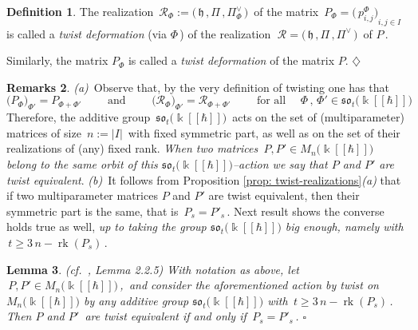 \documentclass[12pt,reqno,twoside,a4paper]{amsart}
\numberwithin{equation}{section}
\newtheorem{lema}{Lemma}[subsection]
\theoremstyle{definition}
\newtheorem{definition}[lema]{Definition}
\newtheorem{rmks}[lema]{Remarks}
\newtheorem{free text}[lema]{}
\theoremstyle{remark}
\newcommand \rk{\operatorname{rk}}
\newcommand{\R}{{\mathcal R}}
\def \kh{{\Bbbk[[\hbar]]}}
\def \lieh{\mathfrak{h}}
\def \lieso{\mathfrak{so}}
\theoremstyle{plain}
\begin{document}
\vskip7pt

\begin{definition}  \label{def: twisted-realization}
%
 The realization  $ \, \R_\Phi := \big(\, \lieh \, , \Pi \, , \Pi^\vee_{\scriptscriptstyle \Phi} \,\big) \, $
 of the matrix  $ \, P_{\scriptscriptstyle \Phi} = {\big(\, p^{\scriptscriptstyle \Phi}_{i,j} \big)}_{i, j \in I} $  \,
 is called a  \textit{twist deformation\/}  (via  $ \Phi \, $)  of the realization
 $ \; \R = \big(\, \lieh \, , \Pi \, , \Pi^\vee \,\big) \, $  of  $ P \, $.
                                                                    \par
   Similarly, the matrix  $ P_{\scriptscriptstyle \Phi} $  is called a  \textit{twist deformation\/}
   of the matrix  $ P $.   \hfill  $ \diamondsuit $
%
\end{definition}

\vskip7pt

\begin{rmks}  \label{rmks: transitivity-twist}
%
 \textit{(a)}\,  Observe that, by the very definition of twisting one has that
  $$  \big(P_{\scriptscriptstyle \Phi}\big)_{\scriptscriptstyle \Phi'} = P_{\scriptscriptstyle \Phi + \Phi'}  \qquad \text{ and }
  \qquad  \big(\R_{\scriptscriptstyle \Phi}\big)_{\scriptscriptstyle \Phi'} = \R_{\scriptscriptstyle \Phi + \Phi'}
  \qquad  \text{ for all }  \quad  \Phi \, , \, \Phi' \in \lieso_t\big(\kh\big)  $$
%
 Therefore, the additive group  $ \, \lieso_t\big(\kh\big) \, $  acts on the set of
 (multiparameter) matrices of size  $ \, n := |I| \, $  with fixed symmetric part,
 as well as on the set of their realizations of (any) fixed rank.  \textsl{When two matrices
 $ \, P , P' \in M_n\big(\kh\big) \, $  belong to the same orbit of this  $ \lieso_t\big(\kh\big) $--action  we say that
 \textit{$ P $  and  $ P' $  are twist equivalent}}.
%
 \vskip5pt
%
   \textit{(b)}\,  It follows from  Proposition \ref{prop: twist-realizations}\textit{(a)\/}
   that if two multiparameter matrices  $ P $  and  $ P' $  are twist equivalent,
   then their symmetric part is the same, that is  $ \, P_s = P'_s \, $.
   Next result shows the converse holds true as well,  \textit{up to taking the group
   $ \lieso_t\big(\kh\big) $  big enough, namely with  $ \, t \geq 3\,n-\rk(P_s) \, $}.
%
\end{rmks}

\vskip3pt

\begin{lema}  \label{lemma: twist=sym}
  \textsl{(cf.\ \cite{GG3}, Lemma 2.2.5)}
%
 \vskip3pt
%
 With notation as above, let  $ \, P , P' \in M_n\big(\kh\big) \, $,
 \,and consider the aforementioned action by twist on  $ M_n\big(\kh\big) $
 by any additive group  $ \lieso_t\big(\kh\big) $  with  $ \, t \geq 3\,n-\rk(P_s) \, $.
 Then  $ P $  and  $ P' \, $  are twist equivalent if and only if  $ \, P_s = P'_s \, $.   \hfill  $ \square $
%
\end{lema}
\end{document}
